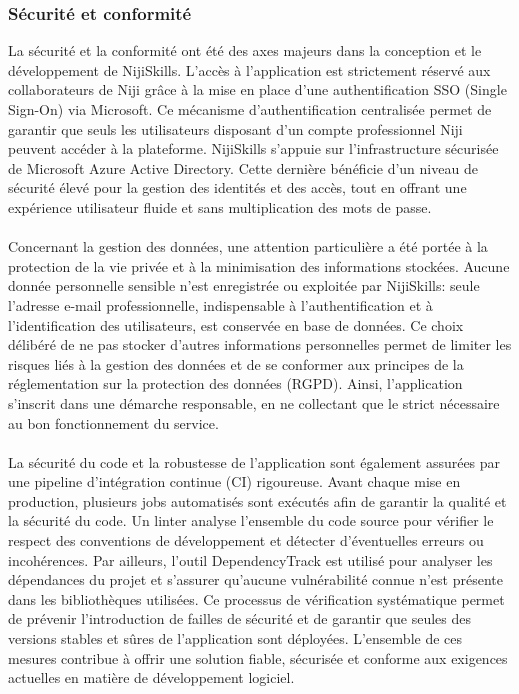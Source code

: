 \documentclass[12pt]{article}
\begin{document}
\subsubsection{Sécurité et conformité}
La sécurité et la conformité ont été des axes majeurs dans la conception et le développement de NijiSkills. L’accès à l’application est strictement réservé aux collaborateurs de Niji grâce à la mise en place d’une authentification SSO (Single Sign-On) via Microsoft. Ce mécanisme d’authentification centralisée permet de garantir que seuls les utilisateurs disposant d’un compte professionnel Niji peuvent accéder à la plateforme. NijiSkills s'appuie sur l’infrastructure sécurisée de Microsoft Azure Active Directory. Cette dernière bénéficie d’un niveau de sécurité élevé pour la gestion des identités et des accès, tout en offrant une expérience utilisateur fluide et sans multiplication des mots de passe.
\\\\
Concernant la gestion des données, une attention particulière a été portée à la protection de la vie privée et à la minimisation des informations stockées. Aucune donnée personnelle sensible n’est enregistrée ou exploitée par NijiSkills: seule l’adresse e-mail professionnelle, indispensable à l’authentification et à l’identification des utilisateurs, est conservée en base de données. Ce choix délibéré de ne pas stocker d’autres informations personnelles permet de limiter les risques liés à la gestion des données et de se conformer aux principes de la réglementation sur la protection des données (RGPD). Ainsi, l’application s’inscrit dans une démarche responsable, en ne collectant que le strict nécessaire au bon fonctionnement du service.
\\\\
La sécurité du code et la robustesse de l’application sont également assurées par une pipeline d’intégration continue (CI) rigoureuse. Avant chaque mise en production, plusieurs jobs automatisés sont exécutés afin de garantir la qualité et la sécurité du code. Un linter analyse l’ensemble du code source pour vérifier le respect des conventions de développement et détecter d’éventuelles erreurs ou incohérences. Par ailleurs, l’outil DependencyTrack est utilisé pour analyser les dépendances du projet et s’assurer qu’aucune vulnérabilité connue n’est présente dans les bibliothèques utilisées. Ce processus de vérification systématique permet de prévenir l’introduction de failles de sécurité et de garantir que seules des versions stables et sûres de l’application sont déployées. L’ensemble de ces mesures contribue à offrir une solution fiable, sécurisée et conforme aux exigences actuelles en matière de développement logiciel.
\end{document}
